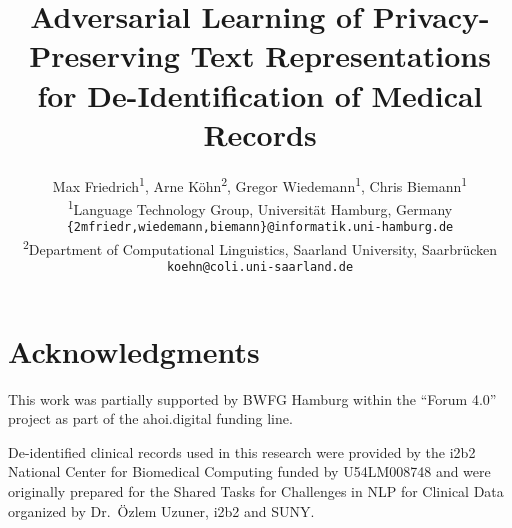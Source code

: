 \documentclass[11pt,a4paper]{article}
\title{Adversarial Learning of Privacy-Preserving Text Representations for De-Identification of Medical Records}
\author{Max Friedrich\textsuperscript{1}, Arne Köhn\textsuperscript{2}, Gregor Wiedemann\textsuperscript{1}, Chris Biemann\textsuperscript{1}\\[3mm] 
\textsuperscript{1}Language Technology Group, Universität Hamburg, Germany\\
\texttt{\{2mfriedr,wiedemann,biemann\}@informatik.uni-hamburg.de}\\[3mm]
\textsuperscript{2}Department of Computational Linguistics, Saarland University, Saarbrücken\\
\texttt{koehn@coli.uni-saarland.de}}
\begin{document}
\maketitle


\acresetall


\section*{Acknowledgments}
This work was partially supported by BWFG Hamburg within the ``Forum 4.0'' project as part of the ahoi.digital funding line.

De-identified clinical records used in this research were provided by the i2b2 National Center for Biomedical Computing funded by U54LM008748 and were originally prepared for the Shared Tasks for Challenges in NLP for Clinical Data organized by Dr.\ Özlem Uzuner, i2b2 and SUNY.



\end{document}
